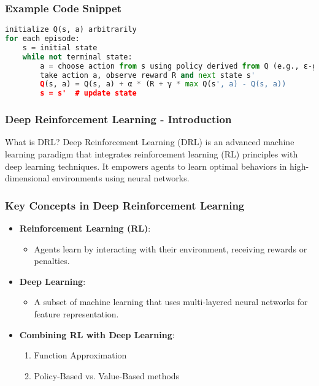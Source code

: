 \documentclass[aspectratio=169]{beamer}
\begin{document}
\begin{frame}[fragile]
  \frametitle{Example Code Snippet}
  \begin{lstlisting}[language=Python]
initialize Q(s, a) arbitrarily
for each episode:
    s = initial state
    while not terminal state:
        a = choose action from s using policy derived from Q (e.g., ε-greedy)
        take action a, observe reward R and next state s'
        Q(s, a) = Q(s, a) + α * (R + γ * max Q(s', a) - Q(s, a))
        s = s'  # update state
  \end{lstlisting}
\end{frame}

\begin{frame}[fragile]
    \frametitle{Deep Reinforcement Learning - Introduction}
    \begin{block}{What is DRL?}
        Deep Reinforcement Learning (DRL) is an advanced machine learning paradigm that integrates reinforcement learning (RL) principles with deep learning techniques. It empowers agents to learn optimal behaviors in high-dimensional environments using neural networks.
    \end{block}
\end{frame}

\begin{frame}[fragile]
    \frametitle{Key Concepts in Deep Reinforcement Learning}
    \begin{itemize}
        \item \textbf{Reinforcement Learning (RL)}: 
        \begin{itemize}
            \item Agents learn by interacting with their environment, receiving rewards or penalties.
        \end{itemize}
        \item \textbf{Deep Learning}: 
        \begin{itemize}
            \item A subset of machine learning that uses multi-layered neural networks for feature representation.
        \end{itemize}
        \item \textbf{Combining RL with Deep Learning}:
        \begin{enumerate}
            \item Function Approximation
            \item Policy-Based vs. Value-Based methods
        \end{enumerate}
    \end{itemize}
\end{frame}
\end{document}
